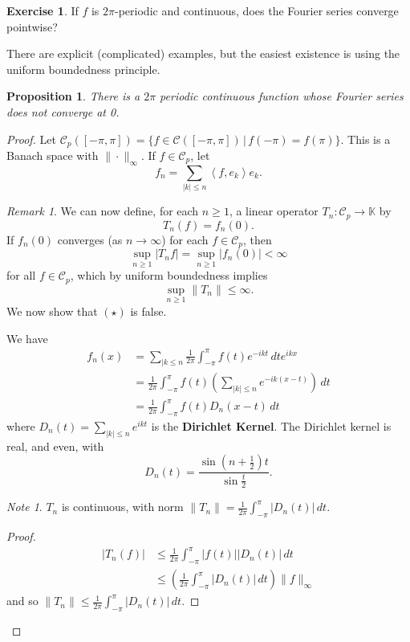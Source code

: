 \documentclass[10pt, oneside, reqno]{amsbook}
\theoremstyle{plain}%
\newtheorem{prop}[thm]{Proposition}
\theoremstyle{definition}
\newtheorem{exer}[thm]{Exercise}
\theoremstyle{remark}
\newtheorem*{rem}{Remark}
\newtheorem*{note}{Note}
\newcommand{\given}{ \, | \,}
\newcommand{\K}{\mathbb{K}}
\newcommand{\iprod}[1]{\left\langle #1 \right\rangle}
\begin{document}
\begin{exer}
    If $f$ is $2\pi$-periodic and continuous, does the Fourier series converge pointwise?  
\end{exer}

There are explicit (complicated) examples, but the easiest existence is using the uniform boundedness principle.  

\begin{prop}
    There is a $2\pi$ periodic continuous function whose Fourier series does not converge at 0.  
\end{prop}
\begin{proof}
    Let $\mathcal{C}_p([-\pi, \pi]) = \{ f \in \mathcal C([-\pi, \pi]) \given f(-\pi) = f(\pi) \}.$  This is a Banach space with $\| \cdot \|_\infty $.  If $f \in \mathcal C_p$, let \[
        f_n = \sum_{|k | \leq n} \iprod{f, e_k} e_k.
    \]
    
\begin{rem}
    We can now define, for each $n \geq 1$, a linear operator $T_n : \mathcal C_p \rightarrow \K$ by \[
        T_n(f) = f_n(0). 
    \]  If $f_n(0)$ converges (as $ n \rightarrow \infty$) for each $f \in \mathcal C_p$, then \[
        \sup_{n \geq 1} |T_n f | = \sup_{n \geq 1} |f_n(0)| < \infty
    \] for all $f \in \mathcal C_p$, which by uniform boundedness implies \[
        \sup_{n \geq 1} \| T_n \| \leq \infty \tag{$\star$}.
    \]  
    We now show that $(\star)$ is false.
\end{rem}
We have \begin{align*}
    f_n(x)  &= \sum_{| k \leq n} \frac{1}{2 \pi} \int_{-\pi}^\pi f(t) e^{-ikt} \, dt e^{ikx}  \\
            &= \frac{1}{2\pi} \int_{-\pi}^\pi f(t) \left( \sum_{|k| \leq n} e^{-ik(x-t)} \right) \, dt \\
            &= \frac{1}{2 \pi} \int_{-\pi}^\pi f(t) D_n(x-t) \, dt 
\end{align*} where $D_n(t) = \sum_{|k| \leq n} e^{ikt}$ is the \textbf{Dirichlet Kernel}.  The Dirichlet kernel is real, and even, with \[
    D_n(t) = \frac{\sin(n+\frac{1}{2}) t}{\sin \frac{t}{2}}.  
\]  

\begin{note}
    $T_n$ is continuous, with norm $\| T_n \| = \frac{1}{2\pi} \int_{-\pi}^\pi |D_n(t) | \, dt$.
\end{note}
\begin{proof}
    \begin{align*}
        |T_n(f)| &\leq \frac{1}{2\pi} \int_{-\pi}^\pi |f(t)| |D_n(t)| \, dt \\
                &\leq \left( \frac{1}{2\pi} \int_{-\pi}^\pi |D_n(t)| \, dt \right) \| f\|_\infty
    \end{align*} and so $\|T_n \| \leq \frac{1}{2\pi} \int_{-\pi}^\pi |D_n(t)| \, dt$. 
    

\end{proof}
\end{proof}
\end{document}
